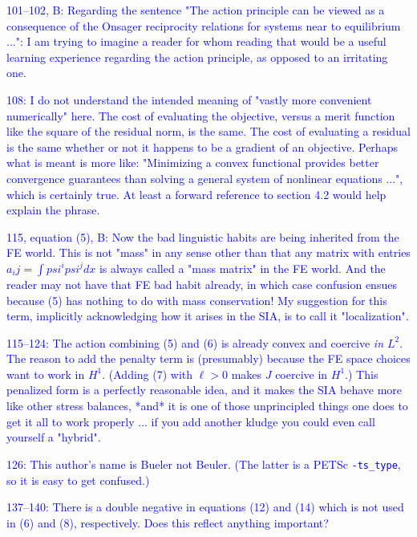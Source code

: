 \documentclass{article}
\theoremstyle{definition}
\theoremstyle{plain}
\begin{document}
\textcolor{blue}{101--102, B:  Regarding the sentence "The action principle can be viewed as a consequence of the Onsager reciprocity relations for systems near to equilibrium ...":  I am trying to imagine a reader for whom reading that would be a useful learning experience regarding the action principle, as opposed to an irritating one.}

\textcolor{blue}{108:  I do not understand the intended meaning of "vastly more convenient numerically" here.  The cost of evaluating the objective, versus a merit function like the square of the residual norm, is the same.  The cost of evaluating a residual is the same whether or not it happens to be a gradient of an objective.  Perhaps what is meant is more like: "Minimizing a convex functional provides better convergence guarantees than solving a general system of nonlinear equations ...", which is certainly true.  At least a forward reference to section 4.2 would help explain the phrase.}

\textcolor{blue}{115, equation (5), B:  Now the bad linguistic habits are being inherited from the FE world.  This is not "mass" in any sense other than that any matrix with entries $a_ij = \int psi^i psi^j dx$ is always called a "mass matrix" in the FE world.  And the reader may not have that FE bad habit already, in which case confusion ensues because (5) has nothing to do with mass conservation!  My suggestion for this term, implicitly acknowledging how it arises in the SIA, is to call it "localization".}

\textcolor{blue}{115--124:  The action combining (5) and (6) is already convex and coercive \emph{in $L^2$}.  The reason to add the penalty term is (presumably) because the FE space choices want to work in $H^1$.  (Adding (7) with $\ell > 0$ makes $J$ coercive in $H^1$.)  This penalized form is a perfectly reasonable idea, and it makes the SIA behave more like other stress balances, *and* it is one of those unprincipled things one does to get it all to work properly ... if you add another kludge you could even call yourself a "hybrid".}

\textcolor{blue}{126:  This author's name is Bueler not Beuler.  (The latter is a PETSc \texttt{-ts\_type}, so it is easy to get confused.)}

\textcolor{blue}{137--140:  There is a double negative in equations (12) and (14) which is not used in (6) and (8), respectively.  Does this reflect anything important?}
\end{document}
